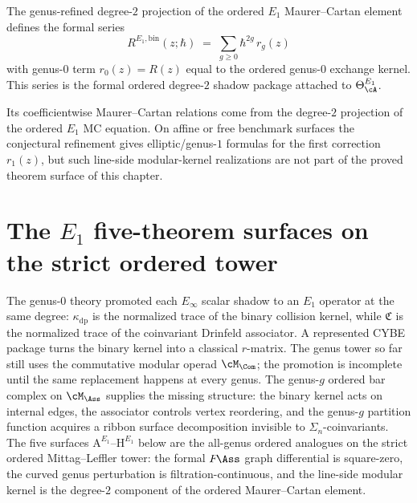 \begin{construction}
\label{constr:modular-r-matrix-genus1}
\ClaimStatusProvedHere
{}
The genus-refined degree-$2$ projection of the ordered $E_1$
Maurer--Cartan element defines the formal series
\begin{equation}
\label{eq:modular-r-matrix-genus1}
R^{E_1,\mathrm{bin}}(z; \hbar)
\;=\;
\sum_{g \geq 0} \hbar^{2g}\, r_g(z)
\end{equation}
with genus-$0$ term $r_0(z)=R(z)$ equal to the ordered genus-$0$
exchange kernel. This series is the formal ordered degree-$2$ shadow
package attached to $\Theta^{E_1}_\cA$.

Its coefficientwise Maurer--Cartan relations come from the degree-$2$
projection of the ordered $E_1$ MC equation. On affine or free
benchmark surfaces the conjectural refinement gives
elliptic/genus-$1$ formulas for the first correction $r_1(z)$, but
such line-side modular-kernel
realizations are not part of the proved theorem surface of this
chapter.
\end{construction}



\section{The \texorpdfstring{$E_1$}{E1} five-theorem surfaces on the
strict ordered tower}
\label{sec:e1-five-theorems}

The genus-$0$ theory promoted each $E_\infty$ scalar shadow to an
$E_1$ operator at the same degree: $\kappa_{\mathrm{dp}}$ is the
normalized trace of the binary collision kernel, while
$\mathfrak{C}$ is the normalized trace of the coinvariant Drinfeld
associator.  A represented CYBE package turns the binary kernel into
a classical $r$-matrix.  The genus tower so far still uses the
commutative modular operad $\cM_\Com$; the promotion is incomplete
until the same replacement happens at every genus. The genus-$g$
ordered bar complex on $\cM_\Ass$ supplies the missing structure:
the binary kernel acts on internal edges, the associator controls
vertex reordering, and the genus-$g$ partition function acquires a
ribbon surface decomposition invisible to $\Sigma_n$-coinvariants.
The five surfaces $\mathrm{A}^{E_1}$--$\mathrm{H}^{E_1}$ below are
the all-genus ordered analogues on the strict ordered
Mittag--Leffler tower: the formal $F\!\Ass$ graph differential is
square-zero, the curved genus perturbation is filtration-continuous,
and the line-side modular kernel is the degree-$2$ component of the
ordered Maurer--Cartan element.

